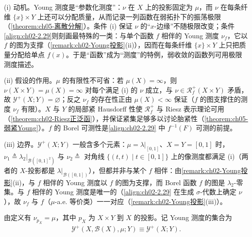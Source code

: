 \documentclass[../../main.tex]{subfiles}%
\begin{document}
\begin{remark}\label{remark:ch02-Young测度动机}
(i) 动机。Young 测度是“参数化测度”：$\nu$ 在 $X$ 上的投影固定为 $\mu$，而 $\nu$ 在每条纤维 $\{x\}\times Y$ 上还可以分配质量，从而记录一列函数在弱拓扑下的振荡极限（\cref{theorem:ch05-离散分解}）。条件 (i) 保证 $\nu$ 的“$x$-边缘”不随极限改变；条件\eqref{align:ch02-2.29}则刻画最特殊的一类：与单个函数 $f$ 相伴的 Young 测度 $\nu_f$，它以 $f$ 的图为支撑（\cref{remark:ch02-Young投影}(ii)），因而在每条纤维 $\{x\}\times Y$ 上只把质量分配给单点 $f(x)$。于是“函数”成为“测度”的特例，弱收敛的函数列可用极限测度描述。

(ii) 假设的作用。$\mu$ 的有限性不可省：若 $\mu(X)=\infty$，则 $\nu(X\times Y)=\mu(X)=\infty$ 对每个满足 (i) 的 $\nu$ 成立，与 $\nu\in\mathscr R^+_f(X\times Y)$ 矛盾，故 $\mathcal Y^+(X;Y)=\varnothing$；反之 $\nu_f$ 的存在性正由 $\mu(X)<\infty$ 保证（$f$ 的图支撑住的测度 $\nu_f$ 有限）。$X$ 与 $Y$ 的局部紧 Hausdorff 性使 $\mathscr R^+_f$ 与 Riesz 表示理论可用（\cref{theorem:ch02-Riesz正泛函}），并保证紧集足够多以讨论胎紧性（\cref{theorem:ch05-弱紧Young}）。$f$ 的 Borel 可测性是\eqref{align:ch02-2.29} 中 $f^{-1}(F)$ 可测的前提。

(iii) 边界。$\mathcal Y^+(X;Y)$ 一般含多个元素：$\mu=\lambda|_{[0,1]}$、$X=Y=[0,1]$ 时，$\nu_1\triangleq\lambda_2|_{\mathscr B([0,1]^2)}$ 与 $\nu_2\triangleq$ 对角线 $\{(t,t)\mid t\in[0,1]\}$ 上的像测度都满足 (i)（两者的 $X$-投影都是 $\lambda|_{\mathscr B([0,1])}$），但都并非与某个 $f$ 相伴：由\cref{remark:ch02-Young投影}(ii)，与 $f$ 相伴的 Young 测度以 $f$ 的图为支撑，而 Borel 函数 $f$ 的图是 $\lambda_2$-零集。与 $f$ 相伴的 Young 测度是唯一的（\eqref{align:ch02-2.29} 在生成 $\sigma$-代数上确定 $\nu$），故 $\nu_f$ 与 $f$（$\mu$-a.e. 等价类）一一对应（\cref{remark:ch02-Young投影}(iii)）。
\end{remark}

由定义有 $\nu_{p_X}=\mu$，其中 $p_X$ 为 $X\times Y$ 到 $X$ 的投影。记 Young 测度的集合为
\begin{align*}
\mathcal Y^+(X,\mathscr B(X),\mu;Y)\equiv\mathcal Y^+(X;Y).
\end{align*}
\end{document}
